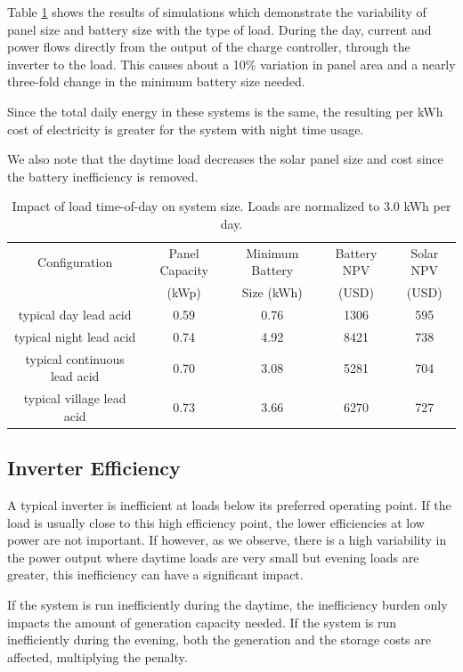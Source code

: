 \documentclass[conference]{IEEEtran}
\begin{document}
Table \ref{table_baseline} shows the results of simulations
which demonstrate the variability of panel size and battery
size with the type of load.
During the day, current and power flows directly from the output of
the charge controller, through the inverter to the load.
This causes about a 10\% variation in panel area and a
nearly three-fold change in the minimum battery size needed.

Since the total daily energy in these systems is the same,
the resulting per kWh cost of electricity is greater for the 
system with night time usage.

We also note that the daytime load decreases the solar panel
size and cost since the battery inefficiency is removed.

\begin{table}
\centering
\begin{tabular}{c c c c c}
Configuration & Panel Capacity & Minimum Battery & Battery NPV & Solar NPV \\
              & (kWp)          & Size (kWh)      & (USD)       & (USD)     \\
\hline
typical day lead acid          & 0.59 & 0.76 & 1306 & 595 \\
typical night lead acid        & 0.74 & 4.92 & 8421 & 738 \\
typical continuous lead acid   & 0.70 & 3.08 & 5281 & 704 \\
typical village lead acid      & 0.73 & 3.66 & 6270 & 727 \\
\end{tabular}
\caption{Impact of load time-of-day on system size.
Loads are normalized to 3.0 kWh per day.}
\label{table_baseline}
\end{table}

\subsection{Inverter Efficiency}

A typical inverter is inefficient at loads below its
preferred operating point.
If the load is usually close to this high efficiency
point, the lower efficiencies at low power are not important.
If however, as we observe, there is a high variability
in the power output where daytime loads are very small
but evening loads are greater, this inefficiency can have
a significant impact.

If the system is run inefficiently during the daytime, the inefficiency
burden only impacts the amount of generation capacity needed.
If the system is run inefficiently during the evening, both the
generation and the storage costs are affected, multiplying the
penalty.
\end{document}
